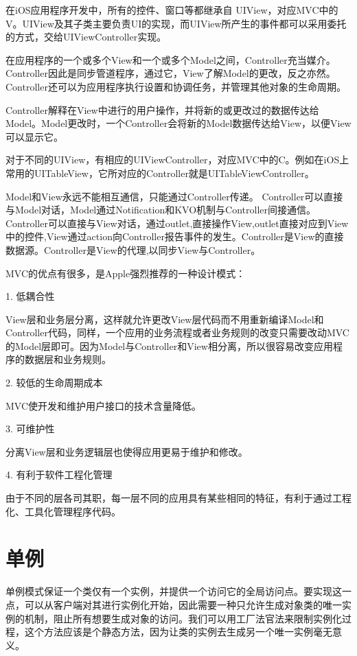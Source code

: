 \documentclass[a4paper, 12pt]{article}
\begin{document}
在iOS应用程序开发中，所有的控件、窗口等都继承自 UIView，对应MVC中的V。UIView及其子类主要负责UI的实现，而UIView所产生的事件都可以采用委托的方式，交给UIViewController实现。

在应用程序的一个或多个View和一个或多个Model之间，Controller充当媒介。Controller因此是同步管道程序，通过它，View了解Model的更改，反之亦然。Controller还可以为应用程序执行设置和协调任务，并管理其他对象的生命周期。

Controller解释在View中进行的用户操作，并将新的或更改过的数据传达给Model。Model更改时，一个Controller会将新的Model数据传达给View，以便View可以显示它。

对于不同的UIView，有相应的UIViewController，对应MVC中的C。例如在iOS上常用的UITableView，它所对应的Controller就是UITableViewController。

Model和View永远不能相互通信，只能通过Controller传递。
Controller可以直接与Model对话，Model通过Notification和KVO机制与Controller间接通信。
Controller可以直接与View对话，通过outlet,直接操作View,outlet直接对应到View中的控件,View通过action向Controller报告事件的发生。Controller是View的直接数据源。Controller是View的代理,以同步View与Controller。

MVC的优点有很多，是Apple强烈推荐的一种设计模式：

1. 低耦合性

View层和业务层分离，这样就允许更改View层代码而不用重新编译Model和Controller代码，同样，一个应用的业务流程或者业务规则的改变只需要改动MVC的Model层即可。因为Model与Controller和View相分离，所以很容易改变应用程序的数据层和业务规则。

2. 较低的生命周期成本

MVC使开发和维护用户接口的技术含量降低。

3. 可维护性

分离View层和业务逻辑层也使得应用更易于维护和修改。

4. 有利于软件工程化管理

由于不同的层各司其职，每一层不同的应用具有某些相同的特征，有利于通过工程化、工具化管理程序代码。

\newpage

\section{单例}
单例模式保证一个类仅有一个实例，并提供一个访问它的全局访问点。要实现这一点，可以从客户端对其进行实例化开始，因此需要一种只允许生成对象类的唯一实例的机制，阻止所有想要生成对象的访问。我们可以用工厂法官法来限制实例化过程，这个方法应该是个静态方法，因为让类的实例去生成另一个唯一实例毫无意义。
\end{document}
